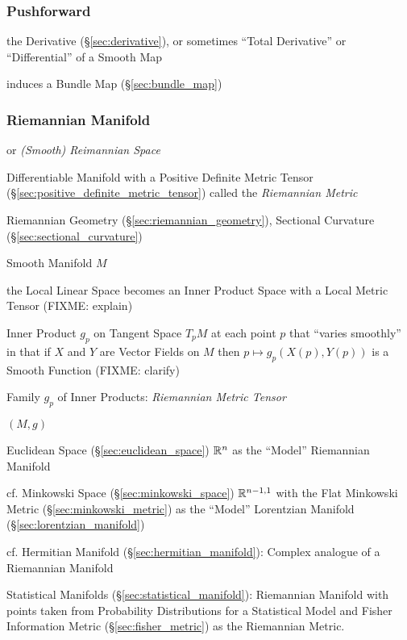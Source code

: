\subsubsection{Pushforward}\label{sec:pushforward}

the Derivative (\S\ref{sec:derivative}), or sometimes ``Total Derivative'' or
``Differential'' of a Smooth Map

induces a Bundle Map (\S\ref{sec:bundle_map})



\subsubsection{Riemannian Manifold}\label{sec:riemannian_manifold}


or \emph{(Smooth) Reimannian Space}

Differentiable Manifold with a Positive Definite Metric Tensor
(\S\ref{sec:positive_definite_metric_tensor}) called the
\emph{Riemannian Metric}

Riemannian Geometry (\S\ref{sec:riemannian_geometry}), Sectional Curvature
(\S\ref{sec:sectional_curvature})

Smooth Manifold $M$

the Local Linear Space becomes an Inner Product Space with a Local Metric Tensor
(FIXME: explain)

Inner Product $g_p$ on Tangent Space $T_pM$ at each point $p$ that
``varies smoothly'' in that if $X$ and $Y$ are Vector Fields on
$M$ then $p \mapsto g_p(X(p),Y(p))$ is a Smooth Function
(FIXME: clarify)

Family $g_p$ of Inner Products: \emph{Riemannian Metric Tensor}

$(M,g)$

Euclidean Space (\S\ref{sec:euclidean_space}) $\mathbb{R}^n$ as the
``Model'' Riemannian Manifold

cf. Minkowski Space (\S\ref{sec:minkowski_space}) $\mathbb{R}^{n-1,1}$
with the Flat Minkowski Metric (\S\ref{sec:minkowski_metric}) as the
``Model'' Lorentzian Manifold (\S\ref{sec:lorentzian_manifold})

cf. Hermitian Manifold (\S\ref{sec:hermitian_manifold}): Complex
analogue of a Riemannian Manifold

\fist Statistical Manifolds (\S\ref{sec:statistical_manifold}):
Riemannian Manifold with points taken from Probability Distributions
for a Statistical Model and Fisher Information Metric
(\S\ref{sec:fisher_metric}) as the Riemannian Metric.

